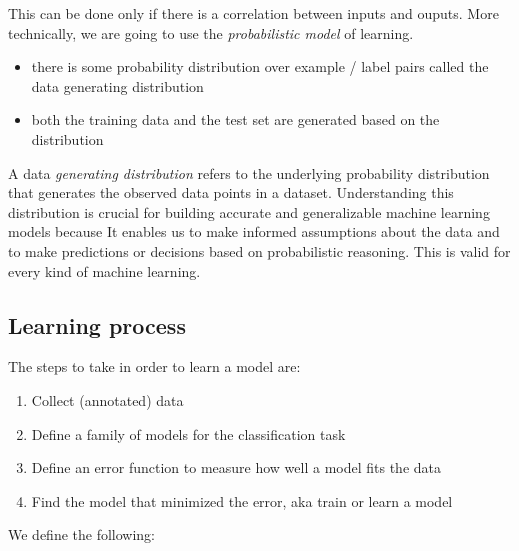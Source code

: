 \documentclass[11pt]{article}
\begin{document}
This can be done only if there is a correlation between inputs and
ouputs. More technically, we are going to use the \emph{probabilistic
model} of learning.

\begin{itemize}
\tightlist
\item
  there is some probability distribution over example / label pairs
  called the data generating distribution
\item
  both the training data and the test set are generated based on the
  distribution
\end{itemize}

A data \emph{generating distribution} refers to the underlying
probability distribution that generates the observed data points in a
dataset. Understanding this distribution is crucial for building
accurate and generalizable machine learning models because It enables us
to make informed assumptions about the data and to make predictions or
decisions based on probabilistic reasoning. This is valid for every kind
of machine learning.

\subsection{Learning process}\label{learning-process}

The steps to take in order to learn a model are:

\begin{enumerate}
\def\labelenumi{\arabic{enumi}.}
\tightlist
\item
  Collect (annotated) data
\item
  Define a family of models for the classification task
\item
  Define an error function to measure how well a model fits the data
\item
  Find the model that minimized the error, aka train or learn a model
\end{enumerate}

We define the following:
\end{document}

